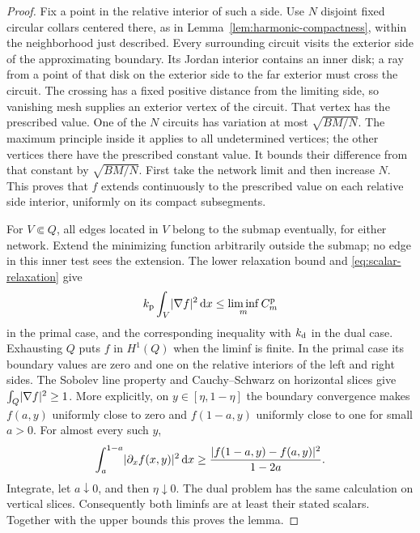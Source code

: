 \begin{proof}
Fix a point in the relative interior of such a side.  Use \(N\) disjoint
fixed circular collars centered there, as in
Lemma~\ref{lem:harmonic-compactness}, within the neighborhood just
described.  Every surrounding circuit visits the exterior side of the
approximating boundary.  Its Jordan interior contains an inner disk;
a ray from a point of that disk on the exterior side to the far exterior
must cross the circuit.  The crossing has a fixed positive distance
from the limiting side, so vanishing mesh supplies an exterior vertex
of the circuit.  That vertex has the prescribed value.  One of the
\(N\) circuits has variation at most \(\sqrt{BM/N}\).  The maximum
principle inside it applies to all undetermined vertices; the other
vertices there have the prescribed constant value.  It bounds their
difference from that constant by \(\sqrt{BM/N}\).  First take the network
limit and then increase \(N\).  This proves that \(f\) extends
continuously to the prescribed value on each relative side interior,
uniformly on its compact subsegments.

For \(V\Subset Q\), all edges located in \(V\) belong to the submap
eventually, for either network.  Extend the minimizing function arbitrarily
outside the submap; no edge in this inner test sees the extension.
The lower relaxation bound and \eqref{eq:scalar-relaxation} give
\[
 k_{\rm p}\int_V\lvert \nabla f\rvert^2\,\mathrm d x
       \le\liminf_m C_m^{\rm p}
\]
in the primal case, and the corresponding inequality with \(k_{\rm d}\)
in the dual case.  Exhausting \(Q\) puts \(f\) in \(H^1(Q)\) when the
liminf is finite.  In the primal case its boundary values are zero and
one on the relative interiors of the left and right sides.  The Sobolev
line property and Cauchy--Schwarz on horizontal slices give
\(\int_Q\lvert \nabla f\rvert^2\ge1\).  More explicitly, on
\(y\in[\eta,1-\eta]\) the boundary convergence makes
\(f(a,y)\) uniformly close to zero and \(f(1-a,y)\) uniformly close
to one for small \(a>0\).  For almost every such \(y\),
\[
 \int_a^{1-a}\lvert \partial_x f(x,y)\rvert^2\,\mathrm d x
 \ge \frac{\lvert f(1-a,y)-f(a,y)\rvert^2}{1-2a}.
\]
Integrate, let \(a\downarrow0\), and then \(\eta\downarrow0\).
The dual problem has the same calculation on vertical slices.
Consequently both liminfs are at least their stated scalars.  Together
with the upper bounds this proves the lemma.
\end{proof}

